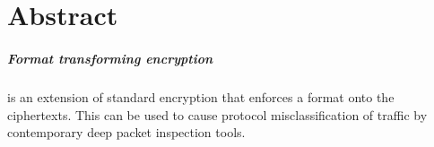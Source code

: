 \documentclass[ %
                    author={Samuel Russell},
                supervisor={Prof. Bogdan Warinschi},
                    degree={MEng},
                     title={Innocuous Ciphertexts},
                  subtitle={The DE-CENSOR Scheme},
                      type={Research},
                      year={2018} ]{dissertation}
\begin{document}


\maketitle


\frontmatter


\makedecl


\tableofcontents




\chapter{Abstract}

\paragraph{Format transforming encryption} is an extension of standard encryption that enforces a format onto the ciphertexts.
This can be used to cause protocol misclassification of traffic by contemporary deep packet inspection tools.
\end{document}
